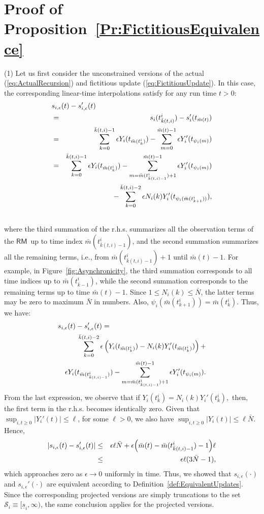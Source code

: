 \documentclass[letter,11pt]{article}
\begin{document}
  
\section{Proof of Proposition~\ref{Pr:FictitiousEquivalence}} \label{Ap:FictitiousEquivalence}

(1) Let us first consider the unconstrained versions of the actual (\ref{eq:ActualRecursion}) and fictitious update (\ref{eq:FictitiousUpdate}). In this case, the corresponding linear-time interpolations satisfy for any run time $t>0$:
 \begin{eqnarray*}
   \lefteqn{s_{i,\epsilon}(t) - s_{i,\epsilon}'(t)} \cr 
   & = & s_i(t_{\bar{k}(t,i)}^i) - s_i'(t_{\bar{m}(t)}) \cr
   & = & \sum_{k=0}^{\bar{k}(t,i)-1}\epsilon Y_{i}(t_{\bar{m}(t_{k}^i)}) - \sum_{m=0}^{\bar{m}(t)-1}\epsilon Y_i'(t_{\psi_i(m)}) \cr 
   & = & \sum_{k=0}^{\bar{k}(t,i)-1}\epsilon Y_{i}(t_{\bar{m}(t_{k}^{i})}) - \sum_{m=\bar{m}(t_{\bar{k}(t,i)-1}^i)+1}^{\bar{m}(t)-1}\epsilon Y_i'(t_{\psi_i(m)}) \cr &&
   -\sum_{k=0}^{\bar{k}(t,i)-2}\epsilon N_i(k) Y_i'(t_{\psi_i(\bar{m}(t_{k+1}^i))}), \cr &&
 \end{eqnarray*}
where the third summation of the r.h.s. summarizes all the observation terms of the {$\mathsf{RM}$}\ up to time index $\bar{m}(t_{\bar{k}(t,i)-1}^{i})$, and the second summation summarizes all the remaining terms, i.e., from $\bar{m}(t_{\bar{k}(t,i)-1}^i)+1$ until $\bar{m}(t)-1$. For example, in Figure~\ref{fig:Asynchronicity}, the third summation corresponds to all time indices up to $\bar{m}(t_{\bar{k}-1}^{i})$, while the second summation corresponds to the remaining terms up to time $\bar{m}(t)-1$. Since $1\leq N_i(k)\leq\bar{N}$, the latter terms may be zero to maximum $\bar{N}$ in numbers. Also, $\psi_i(\bar{m}(t_{k+1}^i)) = \bar{m}(t_k^i)$. Thus, we have: 
 \begin{eqnarray*}
  \lefteqn{s_{i,\epsilon}(t) - s_{i,\epsilon}'(t) = } \cr 
  && \sum_{k=0}^{\bar{k}(t,i)-2}\epsilon \left(Y_{i}(t_{\bar{m}(t_k^i)}) - N_i(k) Y_i'(t_{\bar{m}(t_k^i)}) \right) + \cr &&
   \epsilon Y_{i}(t_{\bar{m}(t_{\bar{k}(t,i)-1}^{i})}) - \sum_{m=\bar{m}(t_{\bar{k}(t,i)-1}^i)+1}^{\bar{m}(t)-1}\epsilon Y_i'(t_{\psi_i(m)}).
 \end{eqnarray*}
 From the last expression, we observe that if 
 $Y_{i}(t_{k}^i) = N_i(k) Y_i'(t_{k}^i),$ then, the first term in the r.h.s. becomes identically zero. Given that $\sup_{i,t\ge{0}}{\left\vert {Y_i'(t)} \right\vert} \le \ell$, for some $\ell>0$, we also have $\sup_{i,t\geq{0}}{\left\vert {Y_{i}(t)} \right\vert}\leq \ell \bar{N}$. Hence, 
 \begin{eqnarray*}
  \vert s_{i,\epsilon}(t) - s_{i,\epsilon}'(t)\vert & \leq & \epsilon \ell\bar{N} + \epsilon\Big(\bar{m}(t)-\bar{m}(t_{\bar{k}(t,i)-1}^{i})-1\Big)\ell \cr & \leq & \epsilon \ell (3\bar{N} - 1),
 \end{eqnarray*}
 which approaches zero as $\epsilon\to{0}$ uniformly in time. Thus, we showed that $s_{i,\epsilon}(\cdot)$ and $s_{i,\epsilon}'(\cdot)$ are equivalent according to Definition~\ref{def:EquivalentUpdates}. Since the corresponding projected versions are simply truncations to the set $\mathcal{S}_i\equiv[\underline{s}_i,\infty)$, the same conclusion applies for the projected versions.
\end{document}
